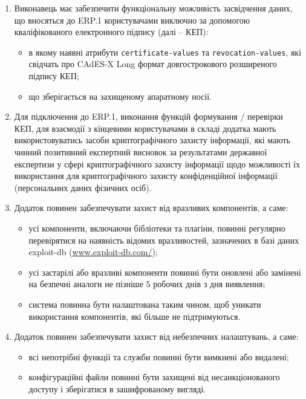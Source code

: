 \documentclass{article}
\begin{document}
\begin{enumerate}
  \item Виконавець має забезпечити функціональну можливість засвідчення даних, що вносяться до ERP.1
        користувачами виключно за допомогою кваліфікованого електронного підпису (далі – КЕП):
    \begin{itemize}
      \item в якому наявні атрибути \texttt{certificate-values} та \texttt{revocation-values},
            які свідчать про CAdES-X Long формат довгострокового розширеного підпису КЕП;
      \item що зберігається на захищеному апаратному носії.
    \end{itemize}

  \item Для підключення до ERP.1, виконання функцій формування / перевірки КЕП, для взаємодії з кінцевими
        користувачами в складі додатка мають використовуватись засоби криптографічного захисту інформації,
        які мають чинний позитивний експертний висновок за результатами державної експертизи у сфері
        криптографічного захисту інформації щодо можливості їх використання для криптографічного захисту
        конфіденційної інформації (персональних даних фізичних осіб).

  \item Додаток повинен забезпечувати захист від вразливих компонентів, а саме:
    \begin{itemize}
      \item усі компоненти, включаючи бібліотеки та плагіни, повинні регулярно
            перевірятися на наявність відомих вразливостей, зазначених в базі даних exploit-db (\url{www.exploit-db.com/});
      \item усі застарілі або вразливі компоненти повинні бути оновлені або замінені на безпечні аналоги не пізніше 5 робочих днів з дня виявлення;
      \item система повинна бути налаштована таким чином, щоб уникати використання компонентів, які більше не підтримуються.
    \end{itemize}

  \item Додаток повинен забезпечувати захист від небезпечних налаштувань, а саме:
    \begin{itemize}
      \item всі непотрібні функції та служби повинні бути вимкнені або видалені;
      \item конфігураційні файли повинні бути захищені від несанкціонованого доступу і зберігатися в зашифрованому вигляді.
    \end{itemize}


\end{enumerate}
\end{document}

